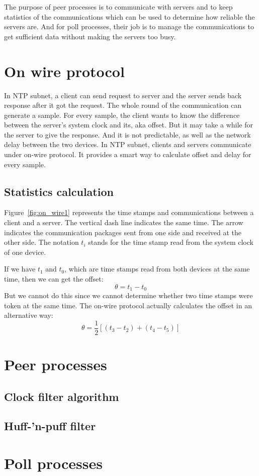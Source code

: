 

The purpose of peer processes is to communicate with servers and to keep
statistics of the communications which can be used to determine how reliable
the servers are. And for poll processes, their job is to manage the
communications to get sufficient data without making the servers too busy.

\section{On wire protocol}%
\label{sec:on_wire_protocol}
In NTP subnet, a client can send request to server and the server sends back
response after it got the request. The whole round of the communication can
generate a sample. For every sample, the client wants to know the difference
between the server's system clock and its, aka offset.
But it may take a while for the server to give the response. And it is not
predictable, as well as the network delay between the two devices.
In NTP subnet, clients and servers communicate under on-wire protocol. It
provides a smart way to calculate offset and delay for every sample. 

\subsection{Statistics calculation}%
\label{sub:statistics_calculation}
Figure~\ref{fig:on_wire1} represents the time stamps and communications between
a client and a server. The vertical dash line indicates the same time. The
arrow indicates the communication packages sent from one side and received at
the other side. The notation $t_i$ stands for the time stamp read from the
system clock of one device. 



If we have $t_1$ and $t_0$, which are time stamps read from both devices at the
same time, then we can get the offset:
$$\theta = t_1 - t_0$$
But we cannot do this since we cannot determine whether two time stamps were
token at the same time. The on-wire protocol actually calculates the offset in
an alternative way:
$$\theta = \frac{1}{2}\left[(t_3 - t_2) + (t_4 - t_5)\right]$$

\section{Peer processes}%
\label{sec:peer_processes}

\subsection{Clock filter algorithm}%
\label{sub:clock_filter_algorithm}

\subsection{Huff-'n-puff filter}%
\label{sub:huff_n_puff_filter}

\section{Poll processes}%
\label{sec:poll_processes}


